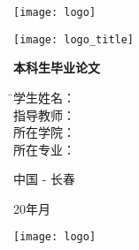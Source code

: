 
\thispagestyle{empty}

\vspace{5mm}

\begin{center}
   \texttt{[image: logo]}
\end{center}

\vspace{2mm}

\begin{center}
  \texttt{[image: logo\_title]}
\end{center}

\vspace{20mm}

\centerline{\sanhao \textbf{本科生毕业论文}}

\vspace{20mm}

\centerline{\sanhao \heiti \nstitlec}

\vspace{20mm}

\begin{tabbing}
    \hspace{30mm}
              \= \sihao 学生姓名： \= \underline{\makebox[6cm]{\sihao\nsauthornamec\hspace{2mm}\nsauthorid}} \\[2mm]
              \> \sihao 指导教师： \> \underline{\makebox[6cm]{\sihao\nsmentorc}} \\[2mm]
              \> \sihao 所在学院： \> \underline{\makebox[6cm]{\sihao\nscollegec}} \\[2mm]
              \> \sihao 所在专业： \> \underline{\makebox[6cm]{\sihao\nsmajorn\hspace{2mm}\nsgrade}} \\[2mm]
\end{tabbing}

\vspace{20mm}

\centerline{中国 - 长春}
\centerline{
    20\makebox[1cm]{}年\makebox[1cm]{}月
}

\newpage

\thispagestyle{empty}

\vspace{5mm}

\begin{center}
   \texttt{[image: logo]}
\end{center}

